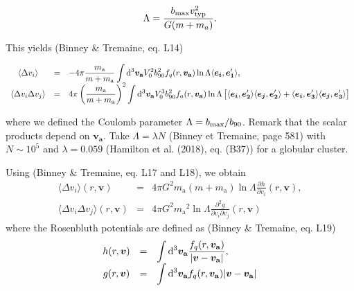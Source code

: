 \documentclass[11pt]{article}
\newcommand{\bv}{\boldsymbol{v}}
\newcommand{\fq}{f_{q}}
\newcommand{\ra}{\mathrm{a}}
\newcommand{\va}{v_{\ra}}
\newcommand{\bva}{\boldsymbol{\va}}
\newcommand{\ma}{m_{\ra}}
\newcommand{\e}[1]{\boldsymbol{e_{#1}}}
\newcommand{\rd}{{\rm{d}}}
\begin{document}
\begin{equation}
  \Lambda=\frac{b_{{\rm max}}v_{{\rm typ}}^{2}}{G(m+m_{a})} .
  \label{Lambda}
\end{equation}

This yields (Binney \& Tremaine, eq. L14)

\begin{equation}
\begin{array}{ccl}
  \langle\Delta v_{i}\rangle & =& \displaystyle{-4\pi\frac{\ma}{m+\ma}
    \int{\rd}^{3}\bva V_{0}^{2}b_{90}^{2} \fq(r,\bva)\ln\Lambda\langle
    \boldsymbol{e_{i}},\e1'\rangle} ,\\
  
  \langle\Delta v_{i}\Delta v_{j}\rangle & = &\displaystyle{ 4\pi\left(
    \frac{\ma}{m+\ma}\right)^{2}\int{\rd}^{3}\bva V_{0}^{3}b_{90}^{2}f_{a}(r,
    \bva)\ln\Lambda  \left[\langle\boldsymbol{e_{i}},\e2'\rangle\langle
      \boldsymbol{e_{j}},\e2'\rangle+\langle\boldsymbol{e_{i}},\e3'\rangle
      \langle\boldsymbol{e_{j}},\e3'\rangle\right]}
\end{array}
\label{eq:delta_v_sum}
\end{equation}


where we defined the Coulomb parameter $\Lambda=b_{{\rm max}}/b_{90}$.
Remark that the scalar products depend on $\boldsymbol{v_{a}}$. Take
$\Lambda=\lambda N$ (Binney et Tremaine, page 581) with $N\sim10^{5}$
and $\lambda=0.059$ (Hamilton et al. (2018), eq. (B37)) for a globular
cluster.

Using (Binney \& Tremaine, eq. L17 and L18), we obtain
\begin{equation}
\begin{array}{ccl}
  \langle\Delta v_{i}\rangle(r,\bv) & =&\displaystyle{4\pi G^{2}\ma(m+\ma)\ln\Lambda\frac{\partial h}{\partial v_{i}}(r,\bv)} ,\\
  
  \langle\Delta v_{i}\Delta v_{j}\rangle(r,\bv) & = &\displaystyle{4\pi G^{2}{\ma}^{2}\ln\Lambda\frac{\partial^{2}g}{\partial v_{i}\partial v_{j}}(r,\bv)}
\end{array}
\label{eq:delta_v_Rosenbluth}
\end{equation}
where the Rosenbluth potentials are defined as (Binney \& Tremaine,
eq. L19)
\begin{equation}
\begin{array}{ccl}
  h(r,\bv) & =&\displaystyle{\int{\rd}^{3}\bva\frac{\fq(r,\bva)}{|\bv-\bva|}} ,\\
  
  g(r,\bv) & = &\displaystyle{\int{\rd}^{3}\bva \fq(r,\bva)|\bv-\bva|}
\end{array}
\label{eq:Rosenbluth}
\end{equation}
\end{document}
